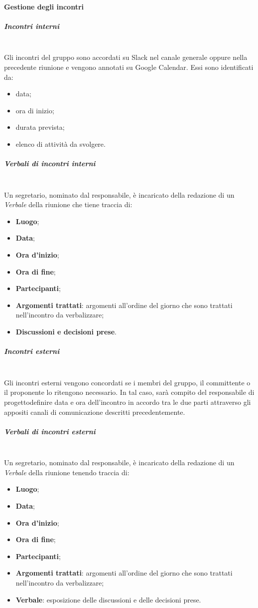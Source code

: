 		\paragraph{Gestione degli incontri}
			\subparagraph{Incontri interni}\mbox{}\\ [1mm]
				Gli incontri del gruppo sono accordati su Slack nel canale generale oppure nella precedente riunione e vengono annotati su Google Calendar. Essi sono identificati da:
				\begin{itemize}
					\item data;
					\item ora di inizio;
					\item durata prevista;
					\item elenco di attività da svolgere.
				\end{itemize}
			\subparagraph{Verbali di incontri interni}\mbox{}\\ [1mm]
				Un segretario, nominato dal responsabile, è incaricato della redazione di un \textit{Verbale} della riunione che tiene traccia di:
				\begin{itemize}
					\item \textbf{Luogo};
					\item \textbf{Data};
					\item \textbf{Ora d'inizio};
					\item \textbf{Ora di fine};
					\item \textbf{Partecipanti};
					\item \textbf{Argomenti trattati}: argomenti all'ordine del giorno che sono trattati nell'incontro da verbalizzare;
					\item \textbf{Discussioni e decisioni prese}.
				\end{itemize}
			\subparagraph{Incontri esterni}\mbox{}\\ [1mm]
				Gli incontri esterni vengono concordati se i membri del gruppo, il committente o il proponente lo ritengono necessario. In tal caso, sarà compito del responsabile di progetto\glosp definire data e ora dell'incontro in accordo tra le due parti attraverso gli appositi canali di comunicazione descritti precedentemente.
			\subparagraph{Verbali di incontri esterni}\mbox{}\\ [1mm]
				Un segretario, nominato dal responsabile, è incaricato della redazione di un \textit{Verbale} della riunione tenendo traccia di:
				\begin{itemize}
					\item \textbf{Luogo};
					\item \textbf{Data};
					\item \textbf{Ora d'inizio};
					\item \textbf{Ora di fine};
					\item \textbf{Partecipanti};
					\item \textbf{Argomenti trattati}: argomenti all'ordine del giorno che sono trattati nell'incontro da verbalizzare;
					\item \textbf{Verbale}: esposizione delle discussioni e delle decisioni prese.
				\end{itemize}

